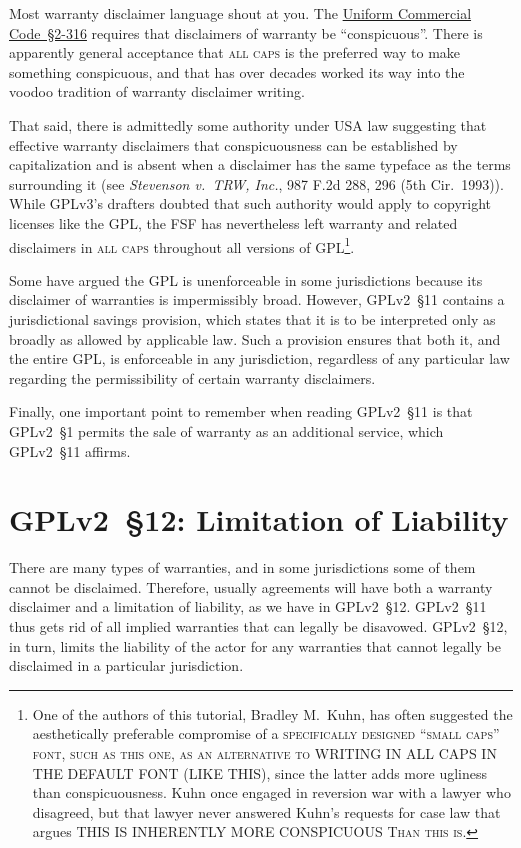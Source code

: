 Most warranty disclaimer language shout at you.  The
\href{http://www.law.cornell.edu/ucc/2/2-316}{Uniform Commercial
  Code~\S2-316} requires that disclaimers of warranty be ``conspicuous''.
There is apparently general acceptance that \textsc{all caps} is the
preferred way to make something conspicuous, and that has over decades worked
its way into the voodoo tradition of warranty disclaimer writing.

That said, there is admittedly some authority under USA law suggesting that
effective warranty disclaimers that conspicuousness can be established by
capitalization and is absent when a disclaimer has the same typeface as the
terms surrounding it (see \textit{Stevenson v.~TRW, Inc.}, 987 F.2d 288, 296
(5th Cir.~1993)).  While GPLv3's drafters doubted that such authority would
apply to copyright licenses like the GPL, the FSF has nevertheless left
warranty and related disclaimers in \textsc{all caps} throughout all versions
of GPL\@\footnote{One of the authors of this tutorial, Bradley M.~Kuhn, has
  often suggested the aesthetically preferable compromise of a
  \textsc{specifically designed ``small caps'' font, such as this one, as an
    alternative to} WRITING IN ALL CAPS IN THE DEFAULT FONT (LIKE THIS),
  since the latter adds more ugliness than conspicuousness.  Kuhn once
  engaged in reversion war with a lawyer who disagreed, but that lawyer never
  answered Kuhn's requests for case law that argues THIS IS INHERENTLY MORE
  CONSPICUOUS \textsc{Than this is}.}.

Some have argued the GPL is unenforceable in some jurisdictions because
its disclaimer of warranties is impermissibly broad.  However, GPLv2~\S11
contains a jurisdictional savings provision, which states that it is to be
interpreted only as broadly as allowed by applicable law.  Such a
provision ensures that both it, and the entire GPL, is enforceable in any
jurisdiction, regardless of any particular law regarding the
permissibility of certain warranty disclaimers.

Finally, one important point to remember when reading GPLv2~\S11 is that GPLv2~\S1
permits the sale of warranty as an additional service, which GPLv2~\S11 affirms.

\section{GPLv2~\S12: Limitation of Liability}
\label{GPLv2s12}

There are many types of warranties, and in some jurisdictions some of them
cannot be disclaimed.  Therefore, usually agreements will have both a
warranty disclaimer and a limitation of liability, as we have in GPLv2~\S12.
GPLv2~\S11 thus gets rid of all implied warranties that can legally be
disavowed. GPLv2~\S12, in turn, limits the liability of the actor for any
warranties that cannot legally be disclaimed in a particular jurisdiction.


